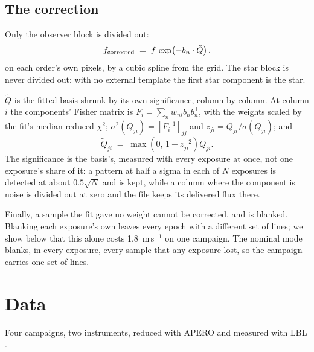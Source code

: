 \documentclass[11pt]{article}
\begin{document}
\subsection{The correction}

Only the observer block is divided out:
%
\begin{equation}
  f_{\rm corrected} \;=\; f \, \exp\!\left(- b_n \cdot \tilde{Q} \right) ,
\end{equation}
%
on each order's own pixels, by a cubic spline from the grid. The star block is
never divided out: with no external template the first star component is the
star.

$\tilde{Q}$ is the fitted basis shrunk by its own significance, column by
column. At column $i$ the components' Fisher matrix is
$F_i = \sum_n w_{ni} b_n b_n^{\mathsf T}$, with the weights scaled by the fit's
median reduced $\chi^2$; $\sigma^2(Q_{ji}) = [F_i^{-1}]_{jj}$ and
$z_{ji} = Q_{ji}/\sigma(Q_{ji})$; and
%
\begin{equation}
  \tilde{Q}_{ji} \;=\; \max\!\left(0,\, 1 - z_{ji}^{-2}\right) Q_{ji} .
\end{equation}
%
The significance is the basis's, measured with every exposure at once, not one
exposure's share of it: a pattern at half a sigma in each of $N$ exposures is
detected at about $0.5\sqrt{N}$ and is kept, while a column where the component
is noise is divided out at zero and the file keeps its delivered flux there.

Finally, a sample the fit gave no weight cannot be corrected, and is blanked.
Blanking each exposure's own leaves every epoch with a different set of lines;
we show below that this alone costs 1.8~m\,s$^{-1}$ on one campaign. The
nominal mode blanks, in every exposure, every sample that any exposure lost, so
the campaign carries one set of lines.

\section{Data}

Four campaigns, two instruments, reduced with APERO \citep{cook2022} and
measured with LBL \citep{artigau2022}.
\end{document}
